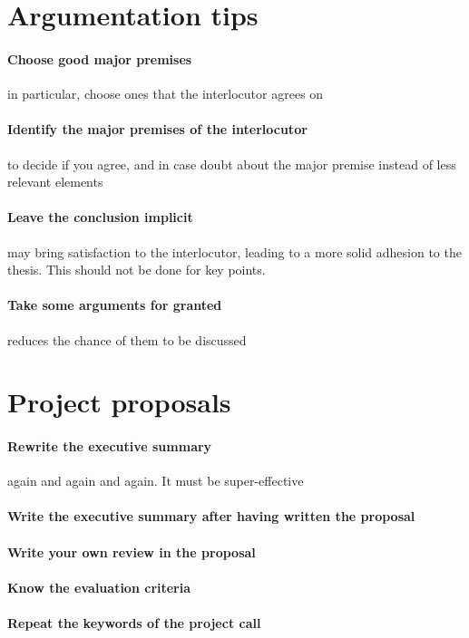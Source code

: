 \documentclass{article}
\begin{document}
\section{Argumentation tips}
\paragraph{Choose good major premises} in particular, choose ones that the interlocutor agrees on
\paragraph{Identify the major premises of the interlocutor} to decide if you agree, and in case doubt about the major premise instead of less relevant elements
\paragraph{Leave the conclusion implicit} may bring satisfaction to the interlocutor, leading to a more solid adhesion to the thesis. This should not be done for key points.
\paragraph{Take some arguments for granted} reduces the chance of them to be discussed

\section{Project proposals}
\paragraph{Rewrite the executive summary} again and again and again. It must be super-effective
\paragraph{Write the executive summary after having written the proposal}
\paragraph{Write your own review in the proposal}
\paragraph{Know the evaluation criteria}
\paragraph{Repeat the keywords of the project call}
\end{document}
